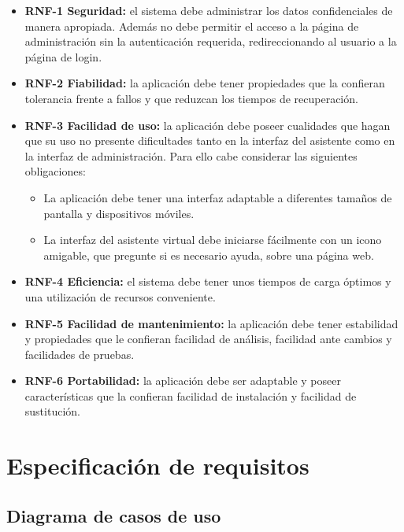 \begin{itemize}
\tightlist

\item
\textbf{RNF-1 Seguridad:} el sistema debe administrar los datos confidenciales de manera apropiada. Además no debe permitir el acceso a la página de administración sin la autenticación requerida, redireccionando al usuario a la página de login.

\item
\textbf{RNF-2 Fiabilidad:} la aplicación debe tener propiedades que la confieran tolerancia frente a fallos y que reduzcan los tiempos de recuperación.

\item
\textbf{RNF-3 Facilidad de uso:} la aplicación debe poseer cualidades que hagan que su uso no presente dificultades tanto en la interfaz del asistente como en la interfaz de administración. Para ello cabe considerar las siguientes obligaciones:
	\begin{itemize}
	\tightlist
	\item
	La aplicación debe tener una interfaz adaptable a diferentes tamaños de pantalla y dispositivos móviles.
	\item
	La interfaz del asistente virtual debe iniciarse fácilmente con un icono amigable, que pregunte si es necesario ayuda, sobre una página web.
	\end{itemize}

\item
\textbf{RNF-4 Eficiencia:} el sistema debe tener unos tiempos de carga óptimos y una utilización de recursos conveniente.

\item
\textbf{RNF-5 Facilidad de mantenimiento:} la aplicación debe tener estabilidad y propiedades que le confieran facilidad de análisis, facilidad ante cambios y facilidades de pruebas.

\item
\textbf{RNF-6 Portabilidad:} la aplicación debe ser adaptable y poseer características que la confieran facilidad de instalación y facilidad de sustitución.

\end{itemize}


\section{Especificación de requisitos}

\newpage
\subsection{Diagrama de casos de uso}

